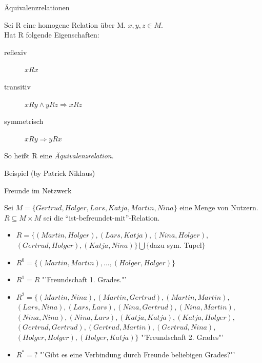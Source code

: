 \begin{frame}{Äquivalenzrelationen}
	\begin{definition}
    Sei R eine homogene Relation über M. $x, y, z \in M$.\\
    Hat R folgende Eigenschaften:
		\begin{description}
			\item[reflexiv] $x R x$
			\item[transitiv] $x R y \wedge y R z \Rightarrow x R z$
			\item[symmetrisch] $x R y \Rightarrow y R x$
		\end{description}
		So heißt R eine \emph{Äquivalenzrelation}.
	\end{definition}
\end{frame}

\begin{frame}{Beispiel (by Patrick Niklaus)}
	\begin{exampleblock}{Freunde im Netzwerk}
    {\small
			Sei $M = \{ Gertrud, Holger, Lars, Katja, Martin, Nina \}$ eine Menge von Nutzern.\\
			$R \subseteq M \times M $ sei die "`ist-befreundet-mit"'-Relation.
		\begin{itemize}
			\item $R = \{ (Martin,Holger), (Lars,Katja), (Nina,Holger),$ \\
						$(Gertrud,Holger), (Katja, Nina) \} \bigcup \{${dazu sym. Tupel}$\}$ \pause
			\item $R^0=\{ (Martin,Martin), ..., (Holger,Holger) \}$ \pause
			\item $R^1=R$ "'Freundschaft 1. Grades."' \pause
			\item $R^2=\{ (Martin,Nina), (Martin,Gertrud), (Martin,Martin),$ \\
						$(Lars,Nina), (Lars,Lars), (Nina,Gertrud),(Nina,Martin),$ \\
						$(Nina,Nina), (Nina,Lars), (Katja,Katja), (Katja,Holger), $ \\
						$(Gertrud,Gertrud), (Gertrud,Martin), (Gertrud,Nina), $ \\
						$(Holger,Holger), (Holger,Katja)\}$ "'Freundschaft 2. Grades"' \pause
			\item $R^*=?$ "'Gibt es eine Verbindung durch Freunde beliebigen Grades?"'
		\end{itemize}
    }
	\end{exampleblock}
\end{frame}

